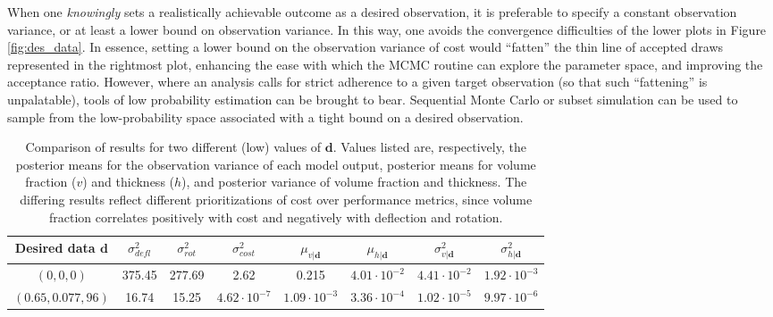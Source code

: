 \documentclass{article}
\begin{document}
When one \emph{knowingly} sets a realistically achievable outcome as a desired observation, it is preferable to specify a constant observation variance, or at least a lower bound on observation variance. In this way, one avoids the convergence difficulties of the lower plots in Figure \ref{fig:des_data}. In essence, setting a lower bound on the observation variance of cost would ``fatten'' the thin line of accepted draws represented in the rightmost plot, enhancing the ease with which the MCMC routine can explore the parameter space, and improving the acceptance ratio. However, where an analysis calls for strict adherence to a given target observation (so that such ``fattening'' is unpalatable), tools of low probability estimation can be brought to bear. Sequential Monte Carlo \citep{Doucet2001,Liu2001a} or subset simulation \citep{Au2001a,Au2003,Zuev2012a} can be used to sample from the low-probability space associated with a tight bound on a desired observation.
\begin{table}[h]
\centering
\begin{tabular}{| c | c  | c  |  c | c  | c | c | c |}
\hline
Desired data $\mathbf d$ & $\sigma^2_{defl}$ & $\sigma^2_{rot}$ & $\sigma^2_{cost}$ & $\mu_{v|\mathbf d}$ &
                            $\mu_{h|\mathbf d}$ & $\sigma^2_{v|\mathbf d}$ & $\sigma^2_{h|\mathbf d}$\\
\hline
$(0, 0, 0)$ & 375.45 & 277.69 & 2.62 & 0.215 & $4.01 \cdot 10^{-2}$&
	$4.41\cdot 10^{-2}$ & $1.92 \cdot 10^{-3}$\\
$(0.65, 0.077, 96)$ & 16.74 & 15.25 & $4.62 \cdot 10^{-7}$ &
	$1.09 \cdot 10^{-3}$ & $3.36 \cdot10^{-4}$ &
	$1.02 \cdot 10^{-5}$ & $9.97 \cdot 10^{-6}$\\
\hline
\end{tabular}
\captionsetup{width=.95\linewidth}
\caption{Comparison of results for two different (low) values of $\mathbf d$. Values listed are, respectively, the posterior means for the observation variance of each model output, posterior means for volume fraction ($v$) and thickness ($h$), and posterior variance of volume fraction and thickness. The differing results reflect different prioritizations of cost over performance metrics, since volume fraction correlates positively with cost and negatively with deflection and rotation.}
\label{table:d_comp}
\end{table}
\end{document}
